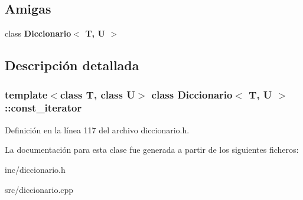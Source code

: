 \subsection*{Amigas}
\begin{DoxyCompactItemize}
\item 
\mbox{\label{classDiccionario_1_1const__iterator_ae50c4dcf749ac5c49596da52815dfa85}} 
class {\bfseries Diccionario$<$ T, U $>$}
\end{DoxyCompactItemize}


\subsection{Descripción detallada}
\subsubsection*{template$<$class T, class U$>$\newline
class Diccionario$<$ T, U $>$\+::const\+\_\+iterator}



Definición en la línea 117 del archivo diccionario.\+h.



La documentación para esta clase fue generada a partir de los siguientes ficheros\+:\begin{DoxyCompactItemize}
\item 
inc/diccionario.\+h\item 
src/diccionario.\+cpp\end{DoxyCompactItemize}
